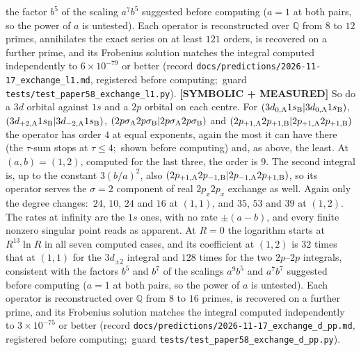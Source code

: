 \documentclass[aps,pra,twocolumn,superscriptaddress,longbibliography]{revtex4-2}
\begin{document}
the factor $b^5$ of the scaling $a^7b^5$ suggested before computing ($a=1$ at both
pairs, so the power of $a$ is untested).  Each operator is reconstructed over
$\mathbb{Q}$ from $8$ to $12$ primes, annihilates the exact series on at least $121$ orders,
is recovered on a further prime, and its Frobenius solution matches the integral
computed independently to $6\times10^{-79}$ or better (record
\texttt{docs/predictions/2026-11-17\_exchange\_l1.md}, registered before computing;\ guard
\texttt{tests/test\_paper58\_exchange\_l1.py}).
\textbf{[SYMBOLIC + MEASURED]} So do a $3d$ orbital against $1s$ and a $2p$ orbital on
each centre.  For $(3d_{0,{\rm A}}1s_{\rm B}|3d_{0,{\rm A}}1s_{\rm B})$,
$(3d_{+2,{\rm A}}1s_{\rm B}|3d_{-2,{\rm A}}1s_{\rm B})$,
$(2p\sigma_{\rm A}2p\sigma_{\rm B}|2p\sigma_{\rm A}2p\sigma_{\rm B})$ and
$(2p_{+1,{\rm A}}2p_{+1,{\rm B}}|2p_{+1,{\rm A}}2p_{+1,{\rm B}})$ the operator has order $4$
at equal exponents, again the most it can have there (the $\tau$-sum stops at $\tau\le4$;\
shown before computing) and, as above, the least.  At $(a,b)=(1,2)$, computed for the last three, the order is $9$.
The second integral is, up to the constant $3(b/a)^2$, also
$(2p_{+1,{\rm A}}2p_{-1,{\rm B}}|2p_{-1,{\rm A}}2p_{+1,{\rm B}})$, so its operator serves the
$\sigma=2$ component of real $2p_x2p_x$ exchange as well.  Again only the degree changes:\
$24$, $10$, $24$ and $16$ at $(1,1)$, and $35$, $53$ and $39$ at $(1,2)$.  The rates at
infinity are the $1s$ ones, with no rate $\pm(a-b)$, and every finite nonzero singular point
reads as apparent.  At $R=0$ the logarithm starts at $R^{13}\ln R$ in all seven computed cases, and
its coefficient at $(1,2)$ is $32$ times that at $(1,1)$ for the $3d_{\pm2}$ integral and $128$ times
for the two $2p$--$2p$ integrals, consistent with the factors $b^5$ and $b^7$ of the scalings $a^9b^5$ and
$a^7b^7$ suggested before computing ($a=1$ at both pairs, so the power of $a$ is untested).
Each operator is reconstructed over $\mathbb{Q}$ from $8$ to $16$ primes, is recovered on a
further prime, and its Frobenius solution matches the integral computed independently to
$3\times10^{-75}$ or better (record
\texttt{docs/predictions/2026-11-17\_exchange\_d\_pp.md}, registered before computing;\ guard
\texttt{tests/test\_paper58\_exchange\_d\_pp.py}).
\end{document}
